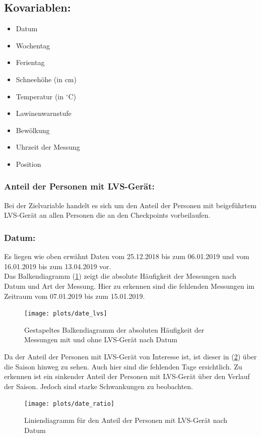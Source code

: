 \documentclass[12pt]{scrreprt}
\begin{document}
\subsection*{Kovariablen:}
\begin{itemize}
	\item Datum
	\item Wochentag
	\item Ferientag
	\item Schneehöhe (in cm)
	\item Temperatur (in $^\circ$C)
	\item Lawinenwarnstufe
	\item Bewölkung
	\item Uhrzeit der Messung
	\item Position
\end{itemize}

\newpage
\subsubsection*{Anteil der Personen mit LVS-Gerät:}
Bei der Zielvariable handelt es sich um den Anteil der Personen mit beigeführtem LVS-Gerät an allen Personen die an den Checkpoints vorbeilaufen.
\subsubsection*{Datum:}
Es liegen wie oben erwähnt Daten vom 25.12.2018 bis zum 06.01.2019 und vom 16.01.2019 bis zum 13.04.2019 vor. \\
Das Balkendiagramm (\ref{pic:date_lvs}) zeigt die absolute Häufigkeit der Messungen nach Datum und Art der Messung. Hier zu erkennen sind die fehlenden Messungen im Zeitraum vom 07.01.2019 bis zum 15.01.2019.
\begin{figure}[H]
	\centering
	\texttt{[image: plots/date\_lvs]}
	\caption{Gestapeltes Balkendiagramm der absoluten Häufigkeit der Messungen mit und ohne LVS-Gerät nach Datum}
	\label{pic:date_lvs}	
\end{figure}

\newpage
\noindent Da der Anteil der Personen mit LVS-Gerät von Interesse ist, ist dieser in (\ref{pic:date_ratio}) über die Saison hinweg zu sehen. Auch hier sind die fehlenden Tage ersichtlich. Zu erkennen ist ein sinkender Anteil der Personen mit LVS-Gerät über den Verlauf der Saison. Jedoch sind starke Schwankungen zu beobachten.
\begin{figure}[H]
	\centering
	\texttt{[image: plots/date\_ratio]}
	\caption{Liniendiagramm für den Anteil der Personen mit LVS-Gerät nach Datum}
	\label{pic:date_ratio}	
\end{figure}
\end{document}
